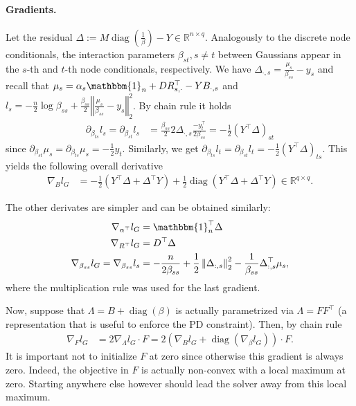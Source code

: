 \documentclass{article}
\newcommand{\oneVec}{\mathbbm{1}}
\newcommand{\IR}{{\mathbb{R}}}\newcommand{\IN}{{\mathbb{N}}}
\newcommand{\bPr}[1]{\ensuremath{\left(#1 \right)}} %
\newcommand{\bNorm}[1]{\left\Vert #1\right\Vert} %
\DeclareMathOperator{\diag}{diag}
\begin{document}
\paragraph {Gradients.}
Let the residual $\Delta:=M\diag\bPr{\frac{1}{\beta}} - Y \in \IR^{n\times q}$.
Analogously to the discrete node conditionals, the interaction parameters $\beta_{st},s\neq t$ between Gaussians appear in
the $s$-th and $t$-th node conditionals, respectively.
We have $\Delta_{\cdot, s} =\frac{\mu_s}{\beta_{ss}} - y_s $ and recall that $\mu_s = \alpha_s\oneVec_n + D R_{s, \cdot}^\top - Y B_{\cdot, s}$ and
$l_s =-\frac{n}{2} \log \beta_{ss} + \frac{\beta_{ss}}{2} \bNorm{\frac{\mu_s}{\beta_{ss}} - y_s }_2^2$.
By chain rule it holds
\begin{align*}
\partial_{\beta_{ts}} l_s = \partial_{\beta_{st}} l_s &= \frac{\beta_{ss}}{2} 2\Delta_{\cdot, s}  \frac{-y_t^\top}{2\beta_{ss}} =-\frac{1}{2}(Y^\top\Delta)_{st} 
\end{align*}
since $\partial_{\beta_{st}} \mu_s = \partial_{\beta_{ts}} \mu_s = -\frac{1}{2} y_t$.
Similarly, we get $\partial_{\beta_{ts}} l_t = \partial_{\beta_{st}} l_t = -\frac{1}{2}(Y^\top\Delta)_{ts}$.
This yields the following overall derivative
\begin{align*}
\nabla_{B} l_G &= - \frac{1}{2} \bPr{Y^\top \Delta + \Delta^\top Y} + \frac{1}{2}\diag\bPr{Y^\top \Delta + \Delta^\top Y} \in\IR^{q\times q}.
\end{align*}

The other derivates are simpler and can be obtained similarly:
\begin{align*}
\nabla_{\alpha^\top} l_G &= \oneVec_n^\top \Delta \\
\nabla_{R^\top} l_G &= D^\top \Delta \\
\nabla_{\beta_{ss}} l_G =\nabla_{\beta_{ss}} l_s &= -\frac{n}{2\beta_{ss}} + \frac{1}{2}\bNorm{\Delta_{:, s}}_2^2 - \frac{1}{\beta_{ss}} \Delta_{:, s}^\top \mu_s,
\end{align*}
where the multiplication rule was used for the last gradient.
\medskip

Now, suppose that $\Lambda = B + \diag(\beta)$ is actually parametrized via $\Lambda = FF^\top$ (a representation that is useful to enforce the PD constraint). Then, by chain rule
\begin{align*}
\nabla_{F} l_G &= 2 \nabla_\Lambda l_G \cdot F =   2 \bPr{\nabla_B l_G + \diag(\nabla_\beta l_G)}\cdot F.
\end{align*}
It is important not to initialize $F$ at zero since otherwise this gradient is always zero. Indeed, the objective in $F$ is actually non-convex with a local maximum at zero. Starting anywhere else however should lead the solver away from this local maximum.
\end{document}
